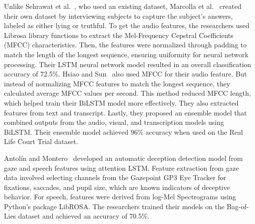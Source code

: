 \documentclass[12pt]{article}
\begin{document}
Unlike Sehrawat et al.~\cite{sehrawat2023deception}, who used an existing dataset, Marcolla et al.~\cite{marcolla2020novel} created their own dataset by interviewing subjects to capture the subject's answers, labeled as either lying or truthful. To get the audio features, the researchers used Librosa library functions to extract the Mel-Frequency Cepstral Coefficients (MFCC) characteristics. Then, the features were normalized through padding to match the length of the longest sequence, ensuring uniformity for neural network processing. Their LSTM neural network model resulted in an overall classification accuracy of 72.5$\%$. 
Hsiao and Sun~\cite{hsiao2022attention} also used MFCC for their audio feature. But instead of normalizing MFCC features to match the longest sequence, they calculated average MFCC values per second. This method reduced MFCC length, which helped train their BiLSTM model more effectively. They also extracted features from text and transcript. Lastly, they proposed an ensemble model that combined outputs from the audio, visual, and transcription models using BiLSTM. Their ensemble model achieved 96$\%$ accuracy when used on the Real Life Court Trial dataset. 
  
Antolín and Montero~\cite{gallardo2021detecting} developed an automatic deception detection model from gaze and speech features using attention LSTM. Feature extraction from gaze data involved selecting channels from the Gazepoint GP3 Eye Tracker for fixations, saccades, and pupil size, which are known indicators of deceptive behavior. For speech, features were derived from log-Mel Spectrograms using Python’s package LibROSA. The researchers trained their models on the Bag-of-Lies dataset and achieved an accuracy of  70.5$\%$.
\end{document}
